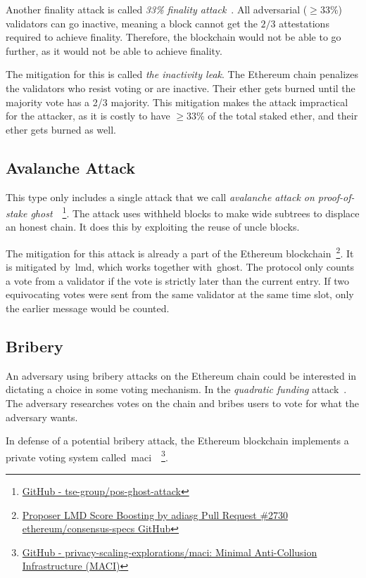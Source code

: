 Another finality attack is called \textit{33\% finality attack}~\cite{EthereumAttackDefense2024}.
All adversarial ($\geq33\%$) validators can go inactive,
meaning a block cannot get the $2/3$ attestations required to achieve finality.
Therefore, the blockchain would not be able to go further, as it would not be able to achieve finality.

The mitigation for this is called \textit{the inactivity leak}.
The Ethereum chain penalizes the validators who resist voting or are inactive.
Their ether gets burned until the majority vote has a 2/3 majority.
This mitigation makes the attack impractical for the attacker, as it is costly to have $\geq33\%$ of the total staked ether, and their ether gets burned as well.

\subsection{Avalanche Attack}\label{subsec:avalanche-attack}
This type only includes a single attack that we call \textit{avalanche attack on proof-of-stake ghost}~\cite{10.1145/3560829.3563560}~\footnote{
\href{https://github.com/tse-group/pos-ghost-attack?tab=readme-ov-file}{GitHub - tse-group/pos-ghost-attack}}.
The attack uses withheld blocks to make wide subtrees to displace an honest chain.
It does this by exploiting the reuse of uncle blocks.

The mitigation for this attack is already a part of the Ethereum blockchain~\footnote{\href{https://github.com/ethereum/consensus-specs/pull/2730}{Proposer LMD Score
Boosting by adiasg Pull Request \#2730 ethereum/consensus-specs GitHub}}.
It is mitigated by~\gls{lmd}, which works together with~\gls{ghost}.
The protocol only counts a vote from a validator if the vote is strictly later than the current entry.
If two equivocating votes were sent from the same validator at the same time slot,
only the earlier message would be counted.

\subsection{Bribery}\label{subsec:bribery}
An adversary using bribery attacks on the Ethereum chain could be interested in dictating a choice in some voting mechanism.
In the \textit{quadratic funding} attack~\cite{EthereumAttacks2024}.
The adversary researches votes on the chain and bribes users to vote for what the adversary wants.

In defense of a potential bribery attack, the Ethereum blockchain implements a private voting system called~\gls{maci}~\cite{EthereumAttacks2024,MACI2022}~\footnote{
    \href{https://github.com/privacy-scaling-explorations/maci}{GitHub -
    privacy-scaling-explorations/maci: Minimal Anti-Collusion Infrastructure (MACI)}}.


